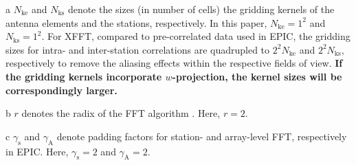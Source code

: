 \documentclass[
  journal=pasa,
  manuscript=article-type,
  year=2020,
  volume=37,
]{cup-journal}
\begin{document}
\begin{table}[htb!]
\begin{threeparttable}
\begin{tablenotes}[hang]
\item[a]$N_\textrm{ke}$ and $N_\textrm{ks}$ denote the sizes (in number of cells) the gridding kernels of the antenna elements and the stations, respectively. In this paper, $N_\textrm{ke}=1^2$ and $N_\textrm{ks}=1^2$. For XFFT, compared to pre-correlated data used in EPIC, the gridding sizes for intra- and inter-station correlations are quadrupled to $2^2 N_\textrm{ke}$ and $2^2 N_\textrm{ks}$, respectively to remove the aliasing effects within the respective fields of view. \textbf{If the gridding kernels incorporate $w$-projection, the kernel sizes will be correspondingly larger.}
\item[b]$r$ denotes the radix of the FFT algorithm \citep{Cooley+Tukey1965}. Here, $r=2$. 
\item[c]$\gamma_\textrm{s}$ and $\gamma_\textrm{A}$ denote padding factors for station- and array-level FFT, respectively in EPIC. Here, $\gamma_\textrm{s}=2$ and $\gamma_\textrm{A}=2$.
\end{tablenotes}
\end{threeparttable}
\end{table}


\end{document}
